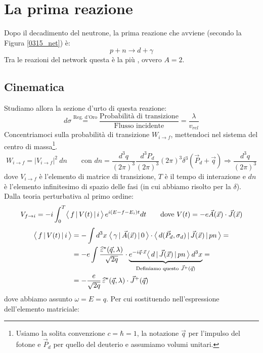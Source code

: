 \section{La prima reazione}\label{0317-sec-abinitio}
Dopo il decadimento del neutrone, la prima reazione che avviene (secondo la Figura \ref{0315_net}) è:
$$p + n \to d + \gamma$$
Tra le reazioni del network questa è la più , ovvero $A=2$. 
\subsection{Cinematica} Studiamo allora la sezione d'urto di questa reazione:
$$d\sigma \overset{\text{Reg. d'Oro}}{=} \frac{\text{Probabilità di transizione}}{\text{Flusso incidente}} = \frac{\lambda}{v_{rel}}$$
Concentriamoci sulla probabilità di transizione $W_{i\to f}$, mettendoci nel sistema del centro di massa\footnote{Usiamo la solita convenzione $c=\hbar = 1$, la notazione $\vec{q}$ per l'impulso del fotone e $\vec{P}_d$ per quello del deuterio e assumiamo volumi unitari.}.
$$W_{i\to f} = |V_{i\to f}|^2\:dn \qquad \text{con   } dn = \frac{d^3q}{(2\pi)^3}\frac{d^3P_d}{(2\pi)^3} (2\pi)^3 \delta^3(\vec{P}_d+\vec{q}) \Rightarrow \frac{d^3q}{(2\pi)^3}$$
dove $V_{i\to f}$ è l'elemento di matrice di transizione, $T$ è il tempo di interazione e $dn$ è l'elemento infinitesimo di spazio delle fasi (in cui abbiamo risolto per la $\delta$). Dalla teoria perturbativa al primo ordine:
$$V_{f\to i} = -i \int_0^T \bigl\langle\, f\, |\,V(t)\, |\,i\, \bigr\rangle\, e^{i(E-f-E_i)t} dt \qquad \text{dove } V(t) = -e \vec{A}(\vec{x}) \cdot \vec{J}(\vec{x}) $$
\begin{displaymath}
\begin{aligned}
\bigl\langle\, f\, |\,V(t)\, |\,i\, \bigr\rangle &= - \int d^3x \; \bigl\langle\, \gamma\, |\,\vec{A}(\vec{x})\, |\,0\, \bigr\rangle \cdot \bigl\langle\, d(\vec{P}_d,\sigma_d)\, |\,\vec{J}(\vec{x})\, |\,pn\, \bigr\rangle = \\
&= -e \int \frac{\widehat{\varepsilon}^*(\vec{q},\lambda)}{\sqrt{2q}} \cdot \underbrace{e^{-i\vec{q}\cdot\vec{x}}\bigl\langle\, d\, |\,\vec{J}(\vec{x})\, |\,pn\, \bigr\rangle\: d^3x}_{\text{Definiamo questo } \vec{J}^+(\vec{q})} = \\
&= -\frac{e}{\sqrt{2q}} \, \widehat{\varepsilon}^*(\vec{q},\lambda) \cdot \vec{J}^+(\vec{q})
\end{aligned}
\end{displaymath}
dove abbiamo assunto $\omega = E = q$. Per cui sostituendo nell'espressione dell'elemento matriciale:
